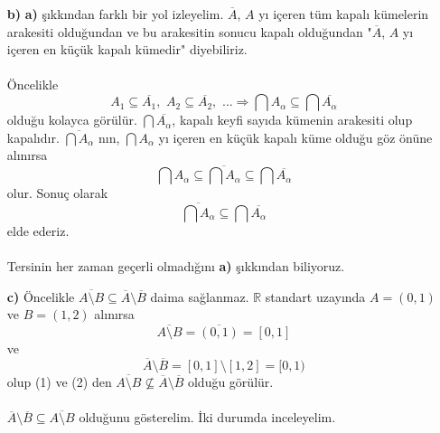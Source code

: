 \documentclass[10pt,a4paper]{article}
\theoremstyle{definition} \newtheorem{teo}{Teorem}
\begin{document}
\begin{enumerate}
\begin{enumerate}
\item[\textbf{b)}]
\textbf{a)} şıkkından farklı bir yol izleyelim. $ \overline{A} $, $ A $ yı içeren tüm kapalı kümelerin arakesiti olduğundan ve bu arakesitin sonucu kapalı olduğundan "$ \overline{A} $, $ A $ yı içeren en küçük kapalı kümedir" diyebiliriz.
\paragraph{}
Öncelikle
\begin{displaymath}
A_{1}\subseteq \overline{A_{1}},\,\, A_{2}\subseteq\overline{A_{2}},\,\,  ... \Rightarrow \bigcap A_{\alpha}\subseteq \bigcap \overline{A_{\alpha}}
\end{displaymath}
olduğu kolayca görülür. $ \bigcap \overline{A_{\alpha}} $, kapalı keyfi sayıda kümenin arakesiti olup kapalıdır. $ \overline{\bigcap A_{\alpha}} $ nın, $ \bigcap A_{\alpha} $ yı içeren en küçük kapalı küme olduğu göz önüne alınırsa
\begin{displaymath}
\bigcap A_{\alpha} \subseteq \overline{\bigcap A_{\alpha}} \subseteq \bigcap \overline{A_{\alpha}}
\end{displaymath}
olur. Sonuç olarak
\begin{displaymath}
\overline{\bigcap A_{\alpha}} \subseteq \bigcap \overline{A_{\alpha}}
\end{displaymath}
elde ederiz.
\paragraph{}
Tersinin her zaman geçerli olmadığını \textbf{a)} şıkkından biliyoruz.

\item[\textbf{c)}] 
Öncelikle $ \overline{A \setminus B} \subseteq \overline{A} \setminus \overline{B} $ daima sağlanmaz.  $  \mathbb{R} $ standart uzayında $ A=(0, 1) $ ve $ B=(1,2) $ alınırsa 
\begin{equation}
\overline{A\setminus B}= \overline{(0, 1)} = [0, 1]
\end{equation}
ve
\begin{equation}
\overline{A} \setminus \overline{B}=[0, 1]\setminus [1, 2]= [0, 1)
\end{equation}
olup (1) ve (2) den $ \overline{A \setminus B} \nsubseteq \overline{A} \setminus \overline{B} $ olduğu görülür.\\
\\
$  \overline{A} \setminus \overline{B}\subseteq \overline{A \setminus B} $ olduğunu gösterelim. İki durumda inceleyelim.\\


\end{enumerate}
\end{enumerate}
\end{document}
